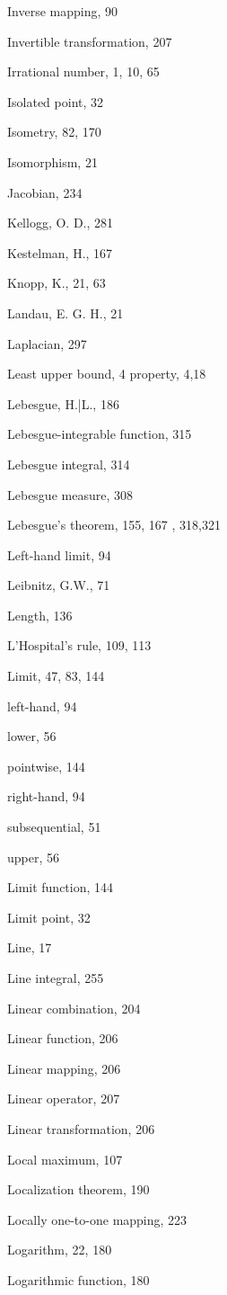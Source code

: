 \documentclass[10pt]{article}
\begin{document}
Inverse mapping, 90

Invertible transformation, 207

Irrational number, 1, 10, 65

Isolated point, 32

Isometry, 82, 170

Isomorphism, 21

Jacobian, 234

Kellogg, O. D., 281

Kestelman, H., 167

Knopp, K., 21, 63

Landau, E. G. H., 21

Laplacian, 297

Least upper bound, 4 property, 4,18

Lebesgue, H.|L., 186

Lebesgue-integrable function, 315

Lebesgue integral, 314

Lebesgue measure, 308

Lebesgue's theorem, 155, 167 , 318,321

Left-hand limit, 94

Leibnitz, G.W., 71

Length, 136

L'Hospital's rule, 109, 113

Limit, 47, 83, 144

left-hand, 94

lower, 56

pointwise, 144

right-hand, 94

subsequential, 51

upper, 56

Limit function, 144

Limit point, 32

Line, 17

Line integral, 255

Linear combination, 204

Linear function, 206

Linear mapping, 206

Linear operator, 207

Linear transformation, 206

Local maximum, 107

Localization theorem, 190

Locally one-to-one mapping, 223

Logarithm, 22, 180

Logarithmic function, 180
\end{document}
